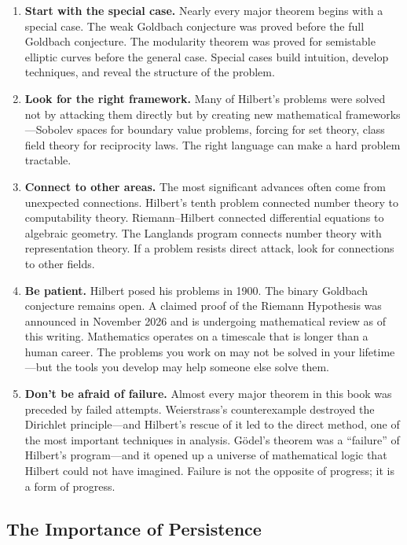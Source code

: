 \begin{enumerate}
    \item \textbf{Start with the special case.} Nearly every major theorem begins with a special case. The weak Goldbach conjecture was proved before the full Goldbach conjecture. The modularity theorem was proved for semistable elliptic curves before the general case. Special cases build intuition, develop techniques, and reveal the structure of the problem.

    \item \textbf{Look for the right framework.} Many of Hilbert's problems were solved not by attacking them directly but by creating new mathematical frameworks---Sobolev spaces for boundary value problems, forcing for set theory, class field theory for reciprocity laws. The right language can make a hard problem tractable.

    \item \textbf{Connect to other areas.} The most significant advances often come from unexpected connections. Hilbert's tenth problem connected number theory to computability theory. Riemann--Hilbert connected differential equations to algebraic geometry. The Langlands program connects number theory with representation theory. If a problem resists direct attack, look for connections to other fields.

    \item \textbf{Be patient.} Hilbert posed his problems in 1900. The binary Goldbach conjecture remains open. A claimed proof of the Riemann Hypothesis was announced in November 2026 and is undergoing mathematical review as of this writing. Mathematics operates on a timescale that is longer than a human career. The problems you work on may not be solved in your lifetime---but the tools you develop may help someone else solve them.

    \item \textbf{Don't be afraid of failure.} Almost every major theorem in this book was preceded by failed attempts. Weierstrass's counterexample destroyed the Dirichlet principle---and Hilbert's rescue of it led to the direct method, one of the most important techniques in analysis. G\"odel's theorem was a ``failure'' of Hilbert's program---and it opened up a universe of mathematical logic that Hilbert could not have imagined. Failure is not the opposite of progress; it is a form of progress.
\end{enumerate}

\subsection{The Importance of Persistence}

